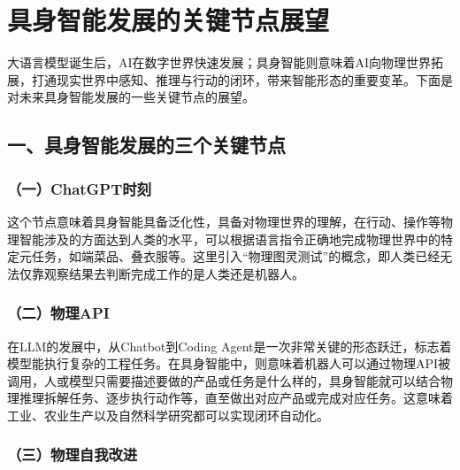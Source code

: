 \setcounter{section}{0}

\hypertarget{ux5177ux8eabux667aux80fdux53d1ux5c55ux7684ux5173ux952eux8282ux70b9ux5c55ux671b}{%
\section{具身智能发展的关键节点展望}\label{ux5177ux8eabux667aux80fdux53d1ux5c55ux7684ux5173ux952eux8282ux70b9ux5c55ux671b}}

大语言模型诞生后，AI在数字世界快速发展；具身智能则意味着AI向物理世界拓展，打通现实世界中感知、推理与行动的闭环，带来智能形态的重要变革。下面是对未来具身智能发展的一些关键节点的展望。

\hypertarget{ux4e00ux5177ux8eabux667aux80fdux53d1ux5c55ux7684ux4e09ux4e2aux5173ux952eux8282ux70b9}{%
\subsection{一、具身智能发展的三个关键节点}\label{ux4e00ux5177ux8eabux667aux80fdux53d1ux5c55ux7684ux4e09ux4e2aux5173ux952eux8282ux70b9}}

\hypertarget{ux4e00chatgptux65f6ux523b}{%
\subsubsection{（一）ChatGPT时刻}\label{ux4e00chatgptux65f6ux523b}}

这个节点意味着具身智能具备泛化性，具备对物理世界的理解，在行动、操作等物理智能涉及的方面达到人类的水平，可以根据语言指令正确地完成物理世界中的特定元任务，如端菜品、叠衣服等。这里引入``物理图灵测试''的概念，即人类已经无法仅靠观察结果去判断完成工作的是人类还是机器人。

\hypertarget{ux4e8cux7269ux7406api}{%
\subsubsection{（二）物理API}\label{ux4e8cux7269ux7406api}}

在LLM的发展中，从Chatbot到Coding Agent是一次非常关键的形态跃迁，标志着模型能执行复杂的工程任务。在具身智能中，则意味着机器人可以通过物理API被调用，人或模型只需要描述要做的产品或任务是什么样的，具身智能就可以结合物理推理拆解任务、逐步执行动作等，直至做出对应产品或完成对应任务。这意味着工业、农业生产以及自然科学研究都可以实现闭环自动化。

\hypertarget{ux4e09ux7269ux7406ux81eaux6211ux6539ux8fdb}{%
\subsubsection{（三）物理自我改进}\label{ux4e09ux7269ux7406ux81eaux6211ux6539ux8fdb}}

